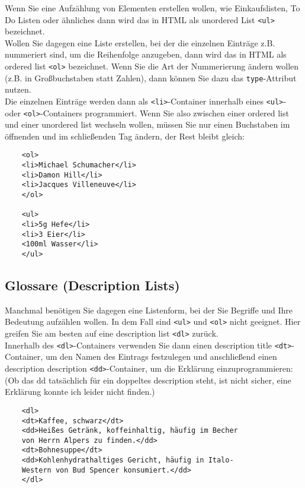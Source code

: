 Wenn Sie eine Aufzählung von Elementen erstellen wollen, wie Einkaufslisten, To Do Listen oder ähnliches dann wird das in HTML als unordered List \verb|<ul>| bezeichnet. \\

Wollen Sie dagegen eine Liste erstellen, bei der die einzelnen Einträge z.B. nummeriert sind, um die Reihenfolge anzugeben, dann wird das in HTML als ordered list \verb|<ol>| bezeichnet. Wenn Sie die Art der Nummerierung ändern wollen (z.B. in Großbuchstaben statt Zahlen), dann können Sie dazu das \verb|type|-Attribut nutzen.\\

Die einzelnen Einträge werden dann als \verb|<li>|-Container innerhalb eines \verb|<ul>|- oder \verb|<ol>|-Containers programmiert. Wenn Sie also zwischen einer ordered list und einer unordered list wechseln wollen, müssen Sie nur einen Buchstaben im öffnenden und im schließenden Tag ändern, der Rest bleibt gleich:

\begin{verbatim}
	<ol>
	<li>Michael Schumacher</li>
	<li>Damon Hill</li>
	<li>Jacques Villeneuve</li>
	</ol>
	
	<ul>
	<li>5g Hefe</li>
	<li>3 Eier</li>
	<100ml Wasser</li>
	</ul>
\end{verbatim}

\subsection{Glossare (Description Lists)}

Manchmal benötigen Sie dagegen eine Listenform, bei der Sie Begriffe und Ihre Bedeutung aufzählen wollen. In dem Fall sind \verb|<ul>| und \verb|<ol>| nicht geeignet. Hier greifen Sie am besten auf eine description list \verb|<dl>| zurück.\\

Innerhalb des \verb|<dl>|-Containers verwenden Sie dann einen description title \verb|<dt>|-Container, um den Namen des Eintrags festzulegen und anschließend einen description description \verb|<dd>|-Container, um die Erklärung einzuprogrammieren: (Ob das dd tatsächlich für ein doppeltes description steht, ist nicht sicher, eine Erklärung konnte ich leider nicht finden.)
\begin{verbatim}
	<dl>
	<dt>Kaffee, schwarz</dt>
	<dd>Heißes Getränk, koffeinhaltig, häufig im Becher 
	von Herrn Alpers zu finden.</dd>
	<dt>Bohnesuppe</dt>
	<dd>Kohlenhydrathaltiges Gericht, häufig in Italo-
	Western von Bud Spencer konsumiert.</dd>
	</dl>
\end{verbatim}

